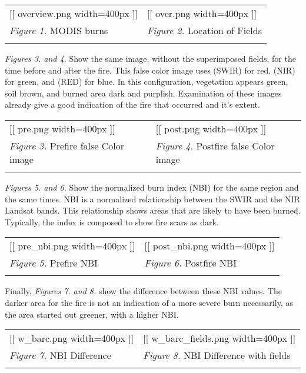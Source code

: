 \documentclass[]{article}
\begin{document}
\begin{longtable}[c]{@{}ll@{}}
\toprule\addlinespace
{[}{[} overview.png \textbar{} width=400px {]}{]} & {[}{[} over.png
\textbar{} width=400px {]}{]}
\\\addlinespace
\midrule\endhead
\emph{Figure 1.} MODIS burns & \emph{Figure 2.} Location of Fields
\\\addlinespace
\bottomrule
\end{longtable}

\emph{Figures 3. and 4.} Show the same image, without the superimposed
fields, for the time before and after the fire. This false color image
uses (SWIR) for red, (NIR) for green, and (RED) for blue. In this
configuration, vegetation appears green, soil brown, and burned area
dark and purplish. Examination of these images already give a good
indication of the fire that occurred and it's extent.

\begin{longtable}[c]{@{}ll@{}}
\toprule\addlinespace
{[}{[} pre.png \textbar{} width=400px {]}{]} & {[}{[} post.png
\textbar{} width=400px {]}{]}
\\\addlinespace
\midrule\endhead
\emph{Figure 3.} Prefire false Color image & \emph{Figure 4.} Postfire
false Color image
\\\addlinespace
\bottomrule
\end{longtable}

\emph{Figures 5. and 6.} Show the normalized burn index (NBI) for the
same region and the same times. NBI is a normalized relationship between
the SWIR and the NIR Landsat bands. This relationship shows areas that
are likely to have been burned. Typically, the index is composed to show
fire scars as dark.

\begin{longtable}[c]{@{}ll@{}}
\toprule\addlinespace
{[}{[} pre\_nbi.png \textbar{} width=400px {]}{]} & {[}{[} post\_nbi.png
\textbar{} width=400px {]}{]}
\\\addlinespace
\midrule\endhead
\emph{Figure 5.} Prefire NBI & \emph{Figure 6.} Postfire NBI
\\\addlinespace
\bottomrule
\end{longtable}

Finally, \emph{Figures 7. and 8.} show the difference between these NBI
values. The darker area for the fire is not an indication of a more
severe burn necessarily, as the area started out greener, with a higher
NBI.

\begin{longtable}[c]{@{}ll@{}}
\toprule\addlinespace
{[}{[} w\_barc.png \textbar{} width=400px {]}{]} & {[}{[}
w\_barc\_fields.png \textbar{} width=400px {]}{]}
\\\addlinespace
\midrule\endhead
\emph{Figure 7.} NBI Difference & \emph{Figure 8.} NBI Difference with
fields
\\\addlinespace
\bottomrule
\end{longtable}
\end{document}
